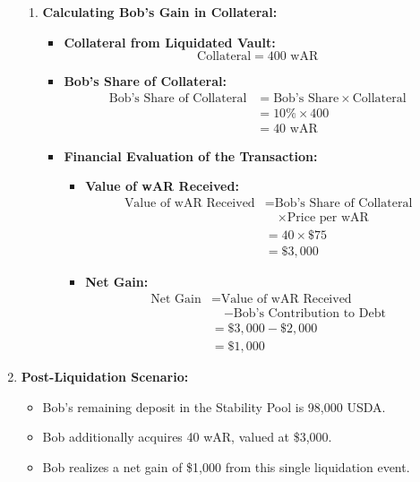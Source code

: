 \begin{enumerate}
\begin{enumerate}
        \item \textbf{Calculating Bob's Gain in Collateral:}
        \begin{itemize}
            \item \textbf{Collateral from Liquidated Vault:}
            $$
            \text{Collateral} = 400 \text{ wAR}
            $$

            \item \textbf{Bob's Share of Collateral:}
            \begin{align*}
            \text{Bob's Share of Collateral} &= 
            \text{Bob's Share} \times \text{Collateral} \\
            &= 10\% \times 400 \\
            &= 40 \text{ wAR}
            \end{align*}

        \item \textbf{Financial Evaluation of the Transaction:}
        \begin{itemize}
        \item \textbf{Value of wAR Received:}
        \begin{align*}
        \text{Value of wAR Received} &= 
        \text{Bob's Share of Collateral} \\
        &\quad \times \text{Price per wAR} \\
        &= 40 \times \$75 \\
        &= \$3,000
        \end{align*}
        
        \item \textbf{Net Gain:}
        \begin{align*}
        \text{Net Gain} &= 
        \text{Value of wAR Received} \\
        &\quad - \text{Bob's Contribution to Debt} \\
        &= \$3,000 - \$2,000 \\
        &= \$1,000
        \end{align*}
        \end{itemize}
        \end{itemize}
    \end{enumerate}

    \item \textbf{Post-Liquidation Scenario:}
    \begin{itemize}
        \item Bob's remaining deposit in the Stability Pool is 98,000 USDA.
        \item Bob additionally acquires 40 wAR, valued at \$3,000.
        \item Bob realizes a net gain of \$1,000 from this single liquidation event.
    \end{itemize}
\end{enumerate}




